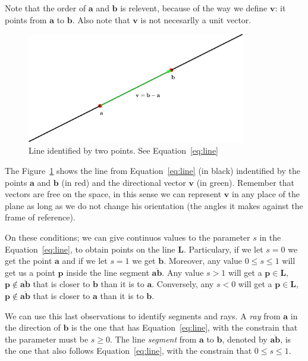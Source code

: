 Note that the order of $\mathbf{a}$ and $\mathbf{b}$ is relevent, because of the way we define $\mathbf{v}$: it points from $\mathbf{a}$ to $\mathbf{b}$.
Also note that $\mathbf{v}$ is not necesarlly a unit vector. 

\begin{figure}[htb]
  \centering
  \includegraphics[width=0.85\textwidth]{img/line}
  \caption{Line identified by two points. See Equation~\ref{eq:line} }
  \label{fig:line}
\end{figure}

The Figure~\ref{fig:line} shows the line from Equation~\ref{eq:line} (in black) indentified by the points $\mathbf{a}$ and $\mathbf{b}$ (in red) and the directional vector $\mathbf{v}$ (in green).
Remember that vectors are free on the space, in this sense we can represent $\mathbf{v}$ in any place of the plane as long as we do not change his orientation (the angles it makes against the frame of reference).


On these conditions; we can give continuos values to the parameter $s$ in the Equation~\ref{eq:line}, to obtain points on the line $\mathbf{L}$.
Particulary, if we let $s = 0$ we get the point $\mathbf{a}$ and if we let $s = 1$ we get  
$\mathbf{b}$.
Moreover, any value $0 \leq s \leq 1$ will get us a point $\mathbf{p}$ inside the line segment $\overline{\mathbf{a} \mathbf{b}}$.
Any value $s > 1$ will get a $\mathbf{p} \in \mathbf{L}$, $\mathbf{p} \notin \overline{\mathbf{a} \mathbf{b}}$ that is closer to $\mathbf{b}$ than it is to $\mathbf{a}$.
Conversely, any $s < 0$ will get a $\mathbf{p} \in \mathbf{L}$, $\mathbf{p} \notin \overline{\mathbf{a} \mathbf{b}}$ that is closer to $\mathbf{a}$ than it is to $\mathbf{b}$.

We can use this last observations to identify segments and rays.
A \emph{ray} from $\mathbf{a}$ in the direction of $\mathbf{b}$ is the one that has Equation~\ref{eq:line}, with the constrain that the parameter must be $s \geq 0$.
The line \emph{segment} from $\mathbf{a}$ to $\mathbf{b}$, denoted by $\overline{\mathbf{a} \mathbf{b}}$, is the one that also follows Equation~\ref{eq:line}, with the constrain that   $0 \leq s \leq 1$.

